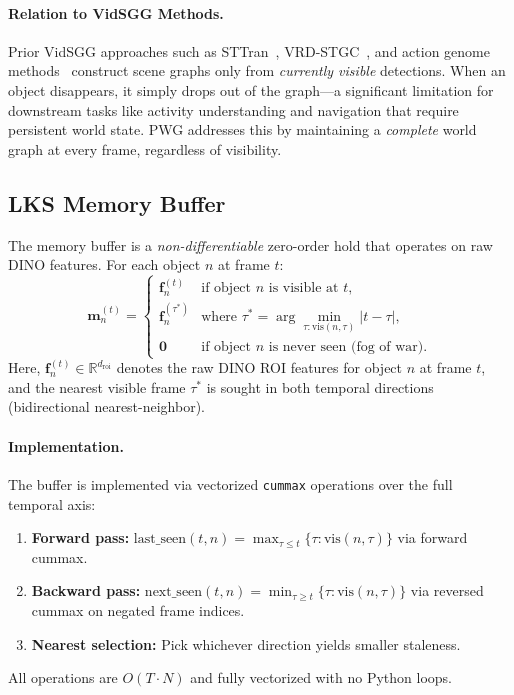 \documentclass[runningheads]{llncs}
\newcommand{\mR}{\mathbb{R}}
\newcommand{\mat}[1]{\bm{#1}}
\begin{document}
\paragraph{Relation to VidSGG Methods.}  Prior VidSGG approaches such as STTran~\cite{cong2021spatial}, VRD-STGC~\cite{shang2017video}, and action genome methods~\cite{ji2020action} construct scene graphs only from \emph{currently visible} detections.  When an object disappears, it simply drops out of the graph---a significant limitation for downstream tasks like activity understanding and navigation that require persistent world state.  PWG addresses this by maintaining a \emph{complete} world graph at every frame, regardless of visibility.

\subsection{LKS Memory Buffer}
\label{sec:lks_buffer}

The memory buffer is a \emph{non-differentiable} zero-order hold that operates on raw DINO features.  For each object $n$ at frame $t$:
\begin{equation}
    \mat{m}_n^{(t)} = \begin{cases}
        \mat{f}_n^{(t)} & \text{if object $n$ is visible at $t$}, \\
        \mat{f}_n^{(\tau^*)} & \text{where } \tau^* = \arg\min_{\tau:\text{vis}(n,\tau)} |t - \tau|, \\
        \bm{0} & \text{if object $n$ is never seen (fog of war)}.
    \end{cases}
    \label{eq:lks_buffer}
\end{equation}
Here, $\mat{f}_n^{(t)} \in \mR^{d_{\text{roi}}}$ denotes the raw DINO ROI features for object $n$ at frame $t$, and the nearest visible frame $\tau^*$ is sought in both temporal directions (bidirectional nearest-neighbor).

\paragraph{Implementation.}  The buffer is implemented via vectorized \texttt{cummax} operations over the full temporal axis:
\begin{enumerate}
    \item \textbf{Forward pass:} $\text{last\_seen}(t,n) = \max_{\tau \le t} \{\tau : \text{vis}(n,\tau)\}$ via forward cummax.
    \item \textbf{Backward pass:} $\text{next\_seen}(t,n) = \min_{\tau \ge t} \{\tau : \text{vis}(n,\tau)\}$ via reversed cummax on negated frame indices.
    \item \textbf{Nearest selection:} Pick whichever direction yields smaller staleness.
\end{enumerate}
All operations are $O(T \cdot N)$ and fully vectorized with no Python loops.
\end{document}
